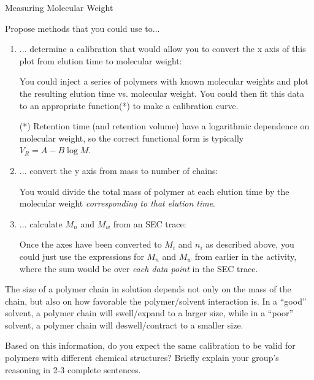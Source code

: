 \begin{activity}{Measuring Molecular Weight}
\begin{ctqs}
	\question Propose methods that you could use to...
	
		\begin{enumerate}
			\item ... determine a calibration that would allow you to convert the x axis of this plot from elution time to molecular weight:
	
				\begin{solution}[1in]{}
					You could inject a series of polymers with known molecular weights and plot the resulting elution time vs. molecular weight.  You could then fit this data to an appropriate function(*) to make a calibration curve.
					
					(*) Retention time (and retention volume) have a logarithmic dependence on molecular weight, so the correct functional form is typically $V_R = A - B \log M$.
					
				\end{solution}
			
			\item ... convert the y axis from mass to number of chains:
	
				\begin{solution}[1in]{}
					You would divide the total mass of polymer at each elution time by the molecular weight \emph{corresponding to that elution time}.
				\end{solution}
			
			\item ... calculate $M_n$ and $M_w$ from an SEC trace:
	
				\begin{solution}[1.5in]{}
					Once the axes have been converted to $M_i$ and $n_i$ as described above, you could just use the expressions for $M_n$ and $M_w$ from earlier in the activity, where the sum would be over \emph{each data point} in the SEC trace.
				\end{solution}
		
		\end{enumerate}
	
	\clearpage
	\question The size of a polymer chain in solution depends not only on the mass of the chain, but also on how favorable the polymer/solvent interaction is.  In a ``good'' solvent, a polymer chain will swell/expand to a larger size, while in a ``poor'' solvent, a polymer chain will deswell/contract to a smaller size.
	
		Based on this information, do you expect the same calibration to be valid for polymers with different chemical structures?  Briefly explain your group's reasoning in 2-3 complete sentences.		
	

\end{ctqs}
\end{activity}
